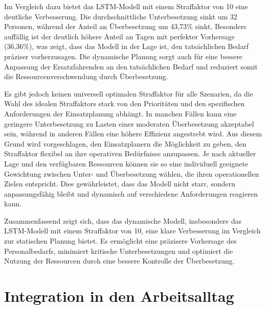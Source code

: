\documentclass[%
pdftex,
oneside,			%
11pt,				%
parskip=half,		%
headheight = 12pt,	%
headsepline,		%
footsepline,		%
footheight = 16pt,	%
abstracton,		%
DIV=calc,		%
BCOR=8mm,		%
headinclude=false,	%
footinclude=false,	%
listof=totoc,		%
toc=bibliography,	%
]{scrreprt}	%
\begin{document}
            Im Vergleich dazu bietet das LSTM-Modell mit einem Straffaktor von 10 eine deutliche Verbesserung. 
            Die durchschnittliche Unterbesetzung sinkt um 32 Personen, während der Anteil an Überbesetzung um 43,73\% sinkt. 
            Besonders auffällig ist der deutlich höhere Anteil an Tagen mit perfekter Vorhersage (36,36\%), was zeigt, dass das Modell in der Lage ist, den tatsächlichen Bedarf präziser vorherzusagen. 
            Die dynamische Planung sorgt auch für eine bessere Anpassung der Ersatzfahrenden an den tatsächlichen Bedarf und reduziert somit die Ressourcenverschwendung durch Überbesetzung.

            Es gibt jedoch keinen universell optimalen Straffaktor für alle Szenarien, da die Wahl des idealen Straffaktors stark von den Prioritäten und den spezifischen Anforderungen der Einsatzplanung abhängt. 
            In manchen Fällen kann eine geringere Unterbesetzung zu Lasten einer moderaten Überbesetzung akzeptabel sein, während in anderen Fällen eine höhere Effizienz angestrebt wird. 
            Aus diesem Grund wird vorgeschlagen, den Einsatzplanern die Möglichkeit zu geben, den Straffaktor flexibel an ihre operativen Bedürfnisse anzupassen. 
            Je nach aktueller Lage und den verfügbaren Ressourcen können sie so eine individuell geeignete Gewichtung zwischen Unter- und Überbesetzung wählen, die ihren operationellen Zielen entspricht. 
            Dies gewährleistet, dass das Modell nicht starr, sondern anpassungsfähig bleibt und dynamisch auf verschiedene Anforderungen reagieren kann.

            Zusammenfassend zeigt sich, dass das dynamische Modell, insbesondere das LSTM-Modell mit einem Straffaktor von 10, eine klare Verbesserung im Vergleich zur statischen Planung bietet. 
            Es ermöglicht eine präzisere Vorhersage des Personalbedarfs, minimiert kritische Unterbesetzungen und optimiert die Nutzung der Ressourcen durch eine bessere Kontrolle der Überbesetzung.



\chapter{Integration in den Arbeitsalltag}
\end{document}
